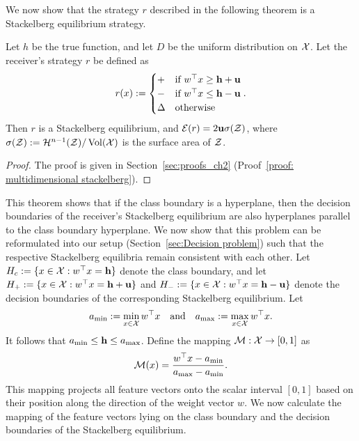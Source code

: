 We now show that the strategy $r$ described in the following theorem is a Stackelberg equilibrium strategy.
\begin{thm}\label{thm: multidimensional Stackelberg}
Let $h$ be the true function, and let $D$ be the uniform distribution on $\mathcal{X}$. Let the receiver's strategy $r$ be defined as
\[
r(x) := 
\begin{cases}
\mathbf{+} & \text{if } w^\top x \geq \mathbf{h} + \mathbf{u} \\
\mathbf{-} & \text{if } w^\top x \leq \mathbf{h} - \mathbf{u} \\
\Delta & \text{otherwise}
\end{cases}.
\]
Then $r$ is a Stackelberg equilibrium, and $\mathcal{E}(r) = 2\mathbf{u}\sigma(\mathcal{Z})$, where $\sigma(\mathcal{Z}) := \mathcal{H}^{n-1}(\mathcal{Z})/\operatorname{Vol}(\mathcal{X})$ is the surface area of $\mathcal{Z}$.
\end{thm}

\begin{proof}
    The proof is given in Section~\ref{sec:proofs_ch2} (Proof~\ref{proof: multidimensional stackelberg}).
\end{proof}
This theorem shows that if the class boundary is a hyperplane, then the decision boundaries of the receiver's Stackelberg equilibrium are also hyperplanes parallel to the class boundary hyperplane.
We now show that this problem can be reformulated into our setup (Section~\ref{sec:Decision problem}) such that the respective Stackelberg equilibria remain consistent with each other.
Let $H_c := \{x \in \mathcal{X} : w^\top x = \mathbf{h}\}$ denote the class boundary, and let $H_+ := \{x \in \mathcal{X}: w^\top x = \mathbf{h} + \mathbf{u} \}$ and $H_- := \{x \in \mathcal{X}: w^\top x = \mathbf{h} - \mathbf{u}\}$ denote the decision boundaries of the corresponding Stackelberg equilibrium. Let 
\[
a_{\min} := \min_{x \in \mathcal{X}} w^\top x \quad \text{and} \quad a_{\max} := \max_{x \in \mathcal{X}} w^\top x.
\]
It follows that $a_{\min} \leq \mathbf{h} \leq a_{\max}$.
Define the mapping $\mathcal{M}: \mathcal{X} \to [0,1]$ as
\[
\mathcal{M}(x) = \frac{w^\top x - a_{\min}}{a_{\max} - a_{\min}}.
\]
This mapping projects all feature vectors onto the scalar interval $[0,1]$ based on their position along the direction of the weight vector $w$. We now calculate the mapping of the feature vectors lying on the class boundary and the decision boundaries of the Stackelberg equilibrium.

